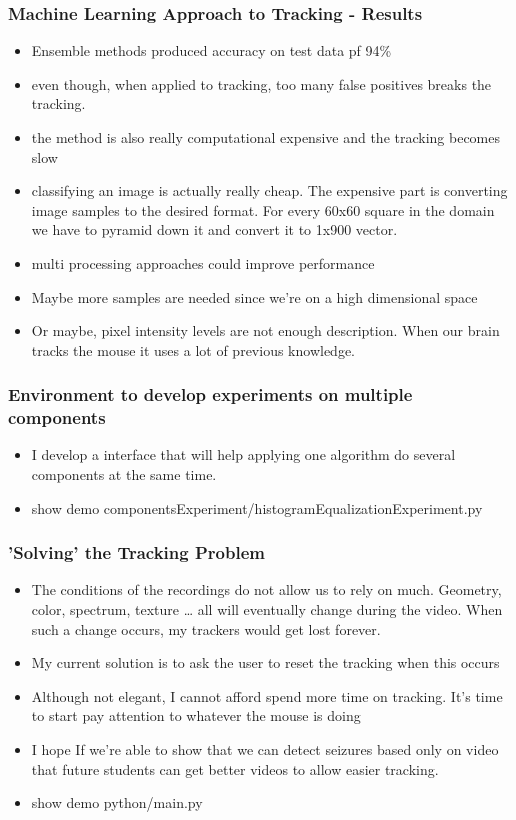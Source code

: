 \documentclass{beamer}
\begin{document}
\begin{frame}
  \frametitle{Machine Learning Approach to Tracking - Results}
  \begin{itemize}
      \item Ensemble methods produced accuracy on test data pf 94\%
      \item even though, when applied to tracking, too many false positives
      breaks the tracking.
      \item the method is also really computational expensive and the tracking becomes slow
      \item classifying an image is actually really cheap. The expensive part is converting image samples to the desired
        format. For every 60x60 square in the domain we have to pyramid down it and convert it to 1x900 vector.
      \item multi processing approaches could improve performance
      \item Maybe more samples are needed since we're on a high dimensional space
      \item Or maybe, pixel intensity levels are not enough description. When our brain tracks the mouse it uses a lot
        of previous knowledge. 
    \end{itemize}
\end{frame}

\begin{frame}
  \frametitle{Environment to develop experiments on multiple components}
  \begin{itemize}
      \item I develop a interface that will help applying one algorithm do several components at the same time.
      \item show demo componentsExperiment/histogramEqualizationExperiment.py
    \end{itemize}
\end{frame}

\begin{frame}
  \frametitle{'Solving' the Tracking Problem}
  \begin{itemize}
      \item The conditions of the recordings do not allow us to rely on much. Geometry, color, spectrum, texture \ldots
        all will eventually change during the video. When such a change occurs, my trackers would get lost forever.
      \item My current solution is to ask the user to reset the tracking when this occurs
      \item Although not elegant, I cannot afford spend more time on tracking. It's time to start pay attention to
        whatever the mouse is doing
      \item I hope If we're able to show that we can detect seizures based only on video that future students can get
        better videos to allow easier tracking.
      \item show demo python/main.py
    \end{itemize}
\end{frame}
\end{document}
